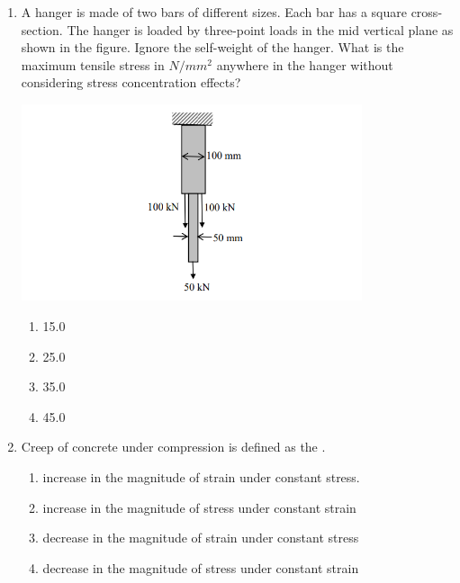 \documentclass[journal,14pt,onecolumn]{IEEEtran}
\theoremstyle{remark}
\begin{document}
\begin{enumerate}[label={Q\arabic*.}]
\item A hanger is made of two bars of different sizes. Each bar has a square cross-section. The hanger is loaded by three-point loads in the mid vertical plane as shown in the figure. Ignore the self-weight of the hanger. What is the maximum tensile stress in $N/mm^2$ anywhere in the hanger without considering stress concentration effects?

\includegraphics[width=10cm]{pics/Screenshot 2025-08-02 133214.png}
\begin{enumerate}
    \item 15.0
    \item 25.0
    \item 35.0
    \item 45.0
\end{enumerate}
\vspace{1cm}

\item Creep of concrete under compression is defined as the \underline{\hspace{2cm}}.
\begin{enumerate}
    \item increase in the magnitude of strain under constant stress.
    \item increase in the magnitude of stress under constant strain
    \item decrease in the magnitude of strain under constant stress
    \item decrease in the magnitude of stress under constant strain
\end{enumerate}

\newpage


\end{enumerate}
\end{document}
